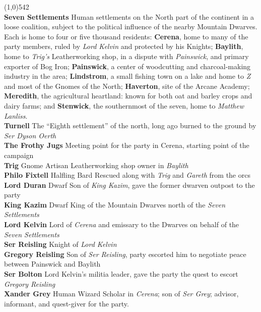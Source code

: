 \documentclass[letterpaper]{article}
\newcommand{\fullline}{\noindent\line(1,0){542} \\}
\newcommand{\person}[3]{\noindent\textbf{#1
    \ifstrequal{#2}{M}{{\color{ProcessBlue}\male}}{%
    \ifstrequal{#2}{F}{\color{VioletRed}\female}{}}}{\scriptsize #3}}
\begin{document}
 \par
\vspace{-0.75em}
\fullline
\textbf{Seven Settlements} Human settlements on the North part of the continent in a loose coalition, subject to the political influence of the nearby Mountain Dwarves. Each is home to four or five thousand residents: \textbf{Cerena}, home to many of the party members, ruled by \emph{Lord Kelvin} and protected by his Knights; \textbf{Baylith}, home to \emph{Trig's} Leatherworking shop, in a dispute with \emph{Painswick}, and primary exporter of Bog Iron; \textbf{Painswick}, a center of woodcutting and charcoal-making industry in the area; \textbf{Lindstrom}, a small fishing town on a lake and home to \emph{Z} and most of the Gnomes of the North; \textbf{Haverton}, site of the Arcane Academy; \textbf{Meredith}, the agricultural heartland: known for both oat and barley crops and dairy farms; and \textbf{Stenwick}, the southernmost of the seven, home to \emph{Matthew Lanliss}.\\
\textbf{Turnell} The ``Eighth settlement'' of the north, long ago burned to the ground by \emph{Ser Dyson Oerth} \\
\textbf{The Frothy Jugs} Meeting point for the party in Cerena, starting point of the campaign\\
\person{Trig}{F}{Gnome Artisan} Leatherworking shop owner in \emph{Baylith} \\
\person{Philo Fixtell}{M}{Halfling Bard} Rescued along with \emph{Trig} and \emph{Gareth} from the orcs \\
\person{Lord Duran}{M}{Dwarf} Son of \emph{King Kazim}, gave the former dwarven outpost to the party \\
\person{King Kazim}{M}{Dwarf} King of the Mountain Dwarves north of the \emph{Seven Settlements} \\
\person{Lord Kelvin}{M}{} Lord of \emph{Cerena} and emissary to the Dwarves on behalf of the \emph{Seven Settlements} \\
\person{Ser Reisling}{M}{} Knight of \emph{Lord Kelvin} \\
\person{Gregory Reisling}{M}{} Son of \emph{Ser Reisling}, party escorted him to negotiate peace between Painswick and Baylith \\
\person{Ser Bolton}{M}{} Lord Kelvin's militia leader, gave the party the quest to escort \emph{Gregory Reisling} \\
\person{Xander Grey}{M}{Human Wizard} Scholar in \emph{Cerena}; son of \emph{Ser Grey}; advisor, informant, and quest-giver for the party.\\
\end{document}
